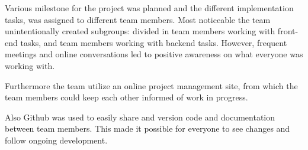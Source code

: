 Various milestone for the project was planned and the different implementation tasks, was assigned to different team members. Most noticeable the team unintentionally created subgroups: divided in team members working with front-end tasks, and team members working with backend tasks.
However, frequent meetings and online conversations led to positive awareness on what everyone was working with.

Furthermore the team utilize an online project management site, from which the team members could keep each other informed of work in progress.

Also Github was used to easily share and version code and documentation between team members. This made it possible for everyone to see changes and follow ongoing development.
